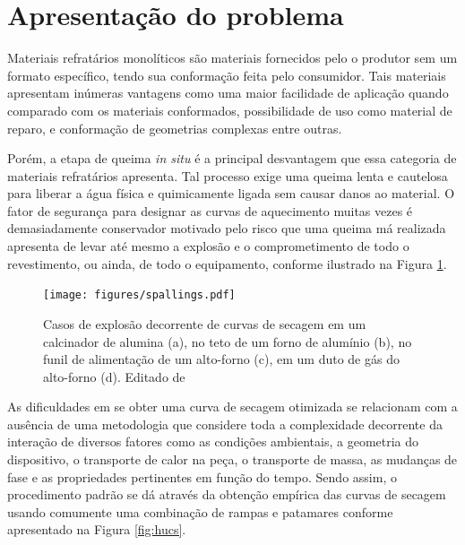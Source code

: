 \section{Apresentação do problema}
   Materiais refratários monolíticos são materiais fornecidos pelo o produtor
   sem um formato específico, tendo sua conformação feita pelo consumidor. Tais
   materiais apresentam inúmeras vantagens como uma maior facilidade de
   aplicação quando comparado com os materiais conformados, possibilidade de uso
   como material de reparo, e conformação de geometrias complexas entre outras.

   Porém, a etapa de queima \textit{in situ} é a principal desvantagem que essa
   categoria de materiais refratários apresenta. Tal processo exige uma queima
   lenta e cautelosa para liberar a água física e quimicamente ligada sem causar
   danos ao material. O fator de segurança para designar as curvas de
   aquecimento muitas vezes é demasiadamente conservador motivado pelo risco que
   uma queima má realizada apresenta de levar até mesmo a explosão e o
   comprometimento de todo o revestimento, ou ainda, de todo o equipamento,
   conforme ilustrado na Figura \ref{fig:spalls}.
    
    \begin{figure}[ht]
        \centering
        \texttt{[image: figures/spallings.pdf]}
        \caption{Casos de explosão decorrente de curvas de secagem em um
          calcinador de alumina (a), no teto de um forno de alumínio (b), no
          funil de alimentação de um alto-forno (c), em um duto de gás do
          alto-forno (d). Editado de \cite{irish}}
        \label{fig:spalls}
   \end{figure}

   As dificuldades em se obter uma curva de secagem otimizada se relacionam com
   a ausência de uma metodologia que considere toda a complexidade decorrente da
   interação de diversos fatores como as condições ambientais, a geometria do
   dispositivo, o transporte de calor na peça, o transporte de massa, as
   mudanças de fase e as propriedades pertinentes em função do tempo. Sendo
   assim, o procedimento padrão se dá através da obtenção empírica das curvas de
   secagem usando comumente uma combinação de rampas e patamares conforme
   apresentado na Figura \ref{fig:hucs}.
      
